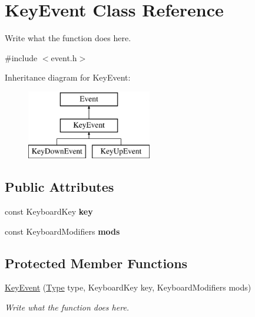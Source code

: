 \hypertarget{classKeyEvent}{\section{Key\+Event Class Reference}
\label{classKeyEvent}
}


Write what the function does here.  




{\ttfamily \#include $<$event.\+h$>$}

Inheritance diagram for Key\+Event\+:\begin{figure}[H]
\begin{center}
\leavevmode
\includegraphics[height=3.000000cm]{classKeyEvent}
\end{center}
\end{figure}
\subsection*{Public Attributes}
\begin{DoxyCompactItemize}
\item 
\hypertarget{classKeyEvent_a99640b48450650dae71b55031b6382d0}{const Keyboard\+Key {\bfseries key}}\label{classKeyEvent_a99640b48450650dae71b55031b6382d0}

\item 
\hypertarget{classKeyEvent_ae5f742fee74ca2ed833fee6f301ba707}{const Keyboard\+Modifiers {\bfseries mods}}\label{classKeyEvent_ae5f742fee74ca2ed833fee6f301ba707}

\end{DoxyCompactItemize}
\subsection*{Protected Member Functions}
\begin{DoxyCompactItemize}
\item 
\hyperlink{classKeyEvent_aea3a7d348f12de966dc7199d26a978b0}{Key\+Event} (\hyperlink{classEvent_a2abf13b5be49315e9e362af02029f058}{Type} type, Keyboard\+Key key, Keyboard\+Modifiers mods)
\begin{DoxyCompactList}\small\item\em Write what the function does here. \end{DoxyCompactList}\end{DoxyCompactItemize}
